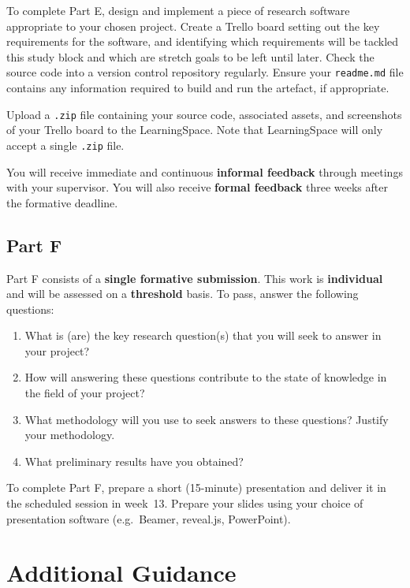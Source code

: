 \documentclass{../fal_assignment}
\begin{document}
To complete Part E, design and implement a piece of research software appropriate to your chosen project.
Create a Trello board setting out the key requirements for the software,
and identifying which requirements will be tackled this study block
and which are stretch goals to be left until later.
Check the source code into a version control repository regularly.
Ensure your \texttt{readme.md} file contains any information required to build and run the artefact, if appropriate.

Upload a \texttt{.zip} file containing your source code, associated assets, and screenshots of your Trello board to the LearningSpace.
Note that LearningSpace will only accept a single \texttt{.zip} file.

You will receive immediate and continuous \textbf{informal feedback} through meetings with your supervisor.
You will also receive \textbf{formal feedback} three weeks after the formative deadline.

\subsection*{Part F}

Part F consists of a \textbf{single formative submission}.
This work is \textbf{individual} and will be assessed on a \textbf{threshold} basis.
To pass, answer the following questions:

\begin{enumerate}[label=(\roman*)]
	\item What is (are) the key research question(s) that you will seek to
		answer in your project?
	\item How will answering these questions contribute to the state of knowledge
		in the field of your project?
	\item What methodology will you use to seek answers to these questions?
		Justify your methodology.
	\item What preliminary results have you obtained?
\end{enumerate}

To complete Part F, prepare a short (15-minute) presentation 
and deliver it in the scheduled session in week~13.
Prepare your slides using your choice of presentation software
(e.g.\ Beamer, reveal.js, PowerPoint).

\section*{Additional Guidance}
\end{document}
